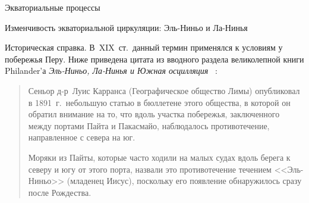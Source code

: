 \begin{chapter}{Экваториальные процессы}
\begin{section}{Изменчивость экваториальной циркуляции: Эль-Ниньо и Ла-Нинья}
\begin{paragraph}{Историческая справка.}
В~XIX~ст.\ данный термин применялся к условиям у побережья Перу. Ниже 
приведена цитата из вводного раздела великолепной книги Philander'а 
\emph{Эль-Ниньо, Ла-Нинья и Южная осцилляция}~%
\cite{Philander:1990}:
%
\begin{quotation}
Сеньор д-р~Луис Карранса (Географическое общество Лимы)
опубликовал в 1891~г.\ небольшую статью в бюллетене этого общества, в которой 
он обратил внимание на то, что вдоль участка побережья, заключенного между 
портами Пайта и Пакасмайо, наблюдалось противотечение, направленное с севера
на юг.
%

Моряки из Пайты, которые часто ходили на малых судах вдоль берега к северу
и югу от этого порта, назвали это противотечение течением <<Эль-Ниньо>>
(младенец Иисус), поскольку его появление обнаружилось сразу после 
Рождества.
%


\end{quotation}
\end{paragraph}
\end{section}
\end{chapter}
